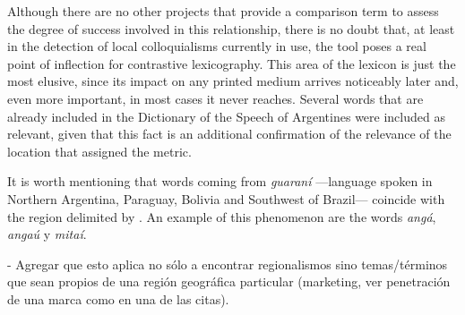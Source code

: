 
Although there are no other projects that provide a comparison term to assess the degree of success involved in this relationship, there is no doubt that, at least in the detection of local colloquialisms currently in use, the tool poses a real point of inflection for contrastive lexicography. This area of the lexicon is just the most elusive, since its impact on any printed medium arrives noticeably later and, even more important, in most cases it never reaches. Several words that are already included in the Dictionary of the Speech of Argentines \cite {academia2008diccionario} were included as relevant, given that this fact is an additional confirmation of the relevance of the location that assigned the metric.


It is worth mentioning that words coming from \emph{guaraní} —language spoken in Northern Argentina, Paraguay, Bolivia and Southwest of Brazil— coincide with the region delimited by \cite{vidal1964espanol}. An example of this phenomenon are the words \textit{angá}, \textit{angaú} y \textit{mitaí}.

- Agregar que esto aplica no sólo a encontrar regionalismos sino temas/términos que sean propios de una región geográfica particular (marketing, ver penetración de una marca como en una de las citas).